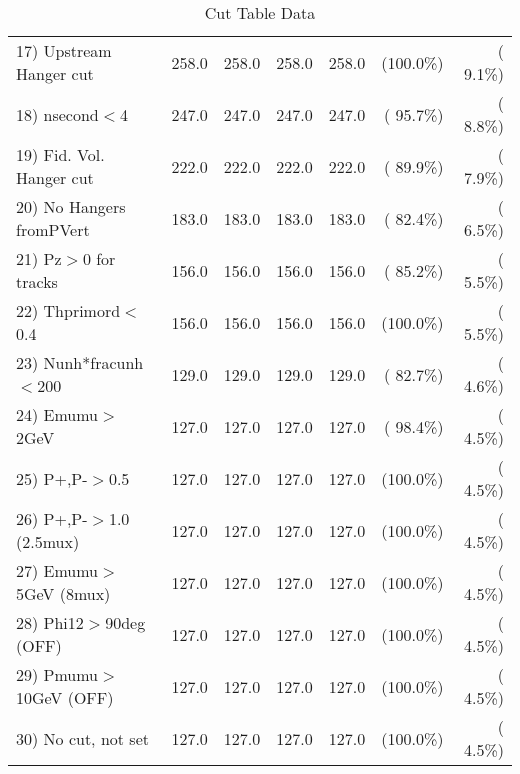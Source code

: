\begin{table}[h!]
\begin{tabular}{||l||r|r|r|r|r|r||}
 17) Upstream Hanger cut  &        258.0 &        258.0 &        258.0 &        258.0 & (100.0\%) & (  9.1\%) \\
 18) nsecond$<$4          &        247.0 &        247.0 &        247.0 &        247.0 & ( 95.7\%) & (  8.8\%) \\
 19) Fid. Vol. Hanger cut &        222.0 &        222.0 &        222.0 &        222.0 & ( 89.9\%) & (  7.9\%) \\
 20) No Hangers fromPVert &        183.0 &        183.0 &        183.0 &        183.0 & ( 82.4\%) & (  6.5\%) \\
 21) Pz$>$0 for tracks    &        156.0 &        156.0 &        156.0 &        156.0 & ( 85.2\%) & (  5.5\%) \\
 22) Thprimord$<$0.4      &        156.0 &        156.0 &        156.0 &        156.0 & (100.0\%) & (  5.5\%) \\
 23) Nunh*fracunh$<$200   &        129.0 &        129.0 &        129.0 &        129.0 & ( 82.7\%) & (  4.6\%) \\
 24) Emumu$>$2GeV         &        127.0 &        127.0 &        127.0 &        127.0 & ( 98.4\%) & (  4.5\%) \\
 25) P+,P-$>$0.5          &        127.0 &        127.0 &        127.0 &        127.0 & (100.0\%) & (  4.5\%) \\
 26) P+,P-$>$1.0 (2.5mux) &        127.0 &        127.0 &        127.0 &        127.0 & (100.0\%) & (  4.5\%) \\
 27) Emumu$>$5GeV  (8mux) &        127.0 &        127.0 &        127.0 &        127.0 & (100.0\%) & (  4.5\%) \\
 28) Phi12$>$90deg  (OFF) &        127.0 &        127.0 &        127.0 &        127.0 & (100.0\%) & (  4.5\%) \\
 29) Pmumu$>$10GeV  (OFF) &        127.0 &        127.0 &        127.0 &        127.0 & (100.0\%) & (  4.5\%) \\
 30) No cut, not set      &        127.0 &        127.0 &        127.0 &        127.0 & (100.0\%) & (  4.5\%) \\
 \hline
 \hline
 \end{tabular}
 \caption{Cut Table  Data     }
 \label{tab-cutcohjpsi-mumu_data}
 \end{table}
